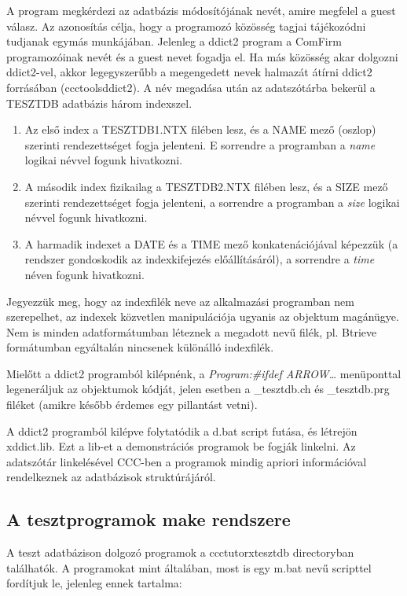 A program megkérdezi az adatbázis módosítójának nevét, amire megfelel
a guest válasz. Az azonosítás célja, hogy a programozó közösség tagjai
tájékozódni tudjanak egymás munkájában. Jelenleg a ddict2 program
a ComFirm programozóinak nevét és a guest nevet fogadja el. Ha más
közösség akar dolgozni ddict2-vel, akkor legegyszerűbb a megengedett
nevek halmazát átírni ddict2 forrásában (ccctools\bslash ddict2). 
A név megadása után az adatszótárba bekerül a TESZTDB adatbázis három indexszel. 

\begin{enumerate}
\item  Az első index a TESZTDB1.NTX filében lesz, és a NAME mező (oszlop)
       szerinti rendezettséget fogja jelenteni. E sorrendre a programban a 
       {\em name} logikai névvel fogunk hivatkozni. 
\item  A második index fizikailag a TESZTDB2.NTX filében lesz, és a SIZE mező 
       szerinti rendezettséget fogja jelenteni, a sorrendre a programban 
       a {\em size} logikai névvel fogunk hivatkozni.       
\item  A harmadik indexet a DATE és a TIME mező konkatenációjával képezzük
       (a rendszer gondoskodik az indexkifejezés előállításáról), a sorrendre
       a {\em time} néven fogunk hivatkozni.
\end{enumerate}
Jegyezzük meg, hogy az indexfilék neve az alkalmazási programban nem 
szerepelhet, az indexek közvetlen manipulációja ugyanis az objektum magánügye. 
Nem is minden adatformátumban léteznek a megadott nevű filék, pl. Btrieve 
formátumban egyáltalán nincsenek különálló indexfilék.

Mielőtt a ddict2 programból kilépnénk, a {\em Program:\#ifdef ARROW\ldots} 
menüponttal legeneráljuk az objektumok kódját, jelen esetben a \_tesztdb.ch 
és \_tesztdb.prg filéket (amikre később érdemes egy pillantást vetni). 

A ddict2 programból kilépve folytatódik a d.bat script futása, 
és létrejön xddict.lib. Ezt a lib-et a demonstrációs programok be fogják 
linkelni. Az adatszótár linkelésével CCC-ben a programok mindig apriori 
információval rendelkeznek az adatbázisok struktúrájáról.


\subsection{A tesztprogramok make rendszere}

 
A teszt adatbázison dolgozó programok a ccctutor\bslash xtesztdb 
directoryban találhatók. A programokat mint általában, most is egy m.bat 
nevű scripttel fordítjuk le, jelenleg ennek tartalma:

